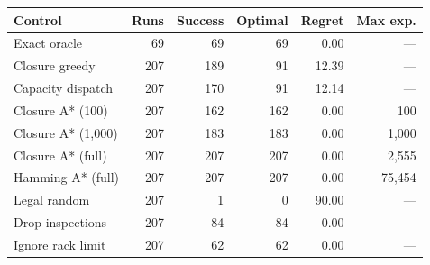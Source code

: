 \begin{tabular}{lrrrrr}\toprule
Control & Runs & Success & Optimal & Regret & Max exp.\\\midrule
Exact oracle & 69 & 69 & 69 & 0.00 & ---\\
Closure greedy & 207 & 189 & 91 & 12.39 & ---\\
Capacity dispatch & 207 & 170 & 91 & 12.14 & ---\\
Closure A* (100) & 207 & 162 & 162 & 0.00 & 100\\
Closure A* (1,000) & 207 & 183 & 183 & 0.00 & 1,000\\
Closure A* (full) & 207 & 207 & 207 & 0.00 & 2,555\\
Hamming A* (full) & 207 & 207 & 207 & 0.00 & 75,454\\
Legal random & 207 & 1 & 0 & 90.00 & ---\\
Drop inspections & 207 & 84 & 84 & 0.00 & ---\\
Ignore rack limit & 207 & 62 & 62 & 0.00 & ---\\
\bottomrule\end{tabular}
